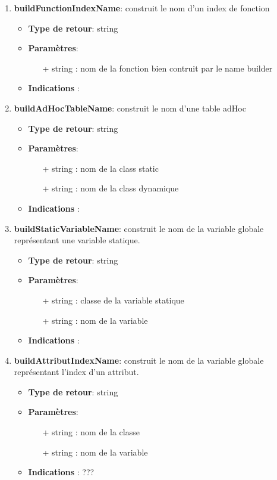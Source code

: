 \documentclass{article}
\begin{document}
\begin{enumerate}
   \item \textbf{buildFunctionIndexName}: construit le nom d'un index de fonction
   \begin{itemize}
     \item \textbf{Type de retour}: string
     \item \textbf{Paramètres}:
     \begin{enumerate}
       \item[+] string : nom de la fonction bien contruit par le name builder
     \end{enumerate}
     \item \textbf{Indications} : 
   \end{itemize}

   \item \textbf{buildAdHocTableName}: construit le nom d'une table adHoc
   \begin{itemize}
     \item \textbf{Type de retour}: string
     \item \textbf{Paramètres}:
     \begin{enumerate}
       \item[+] string : nom de la class static
       \item[+] string : nom de la class dynamique
     \end{enumerate}
     \item \textbf{Indications} :
   \end{itemize}

   \item \textbf{buildStaticVariableName}: construit le nom de la variable globale représentant une variable statique.
   \begin{itemize}
     \item \textbf{Type de retour}: string
     \item \textbf{Paramètres}:
     \begin{enumerate}
       \item[+] string : classe de la variable statique
       \item[+] string : nom de la variable
     \end{enumerate}
     \item \textbf{Indications} :
   \end{itemize}


   \item \textbf{buildAttributIndexName}: construit le nom de la variable globale représentant l'index d'un attribut.
   \begin{itemize}
     \item \textbf{Type de retour}: string
     \item \textbf{Paramètres}:
     \begin{enumerate}
       \item[+] string : nom de la classe
       \item[+] string : nom de la variable
     \end{enumerate}
     \item \textbf{Indications} : ???
   \end{itemize}


\end{enumerate}
\end{document}
